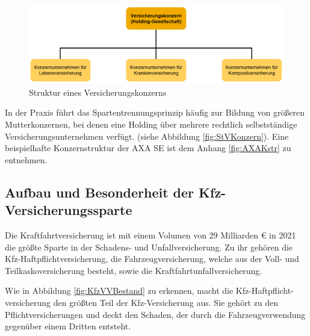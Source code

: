 \begin{figure}[h]
    \centering
    \includegraphics[width=1\textwidth]{img/Struktur_VKonzern2.jpg}
    \caption[Struktur eines Versicherungskonzerns]{Struktur eines Versicherungskonzerns\autocite{StVKonzern}}
    \label{fig:StVKonzern}
\end{figure}


In der Praxis führt das Spartentrennungsprinzip häufig zur Bildung von größeren Mutterkonzernen, bei denen eine Holding über mehrere rechtlich selbstständige Versicherungsunternehmen verfügt. (siehe Abbildung \vref{fig:StVKonzern}). Eine beispielhafte Konzernstruktur der AXA SE ist dem Anhang \ref{fig:AXAKstr} zu entnehmen. 


\subsection{Aufbau und Besonderheit der Kfz-Versicherungssparte}

Die Kraftfahrtversicherung ist mit einem Volumen von 29 Milliarden € in 2021 die größte Sparte in der Schadens- und Unfallversicherung.\autocite[Vgl.][]{GDVSUV} Zu ihr gehören die Kfz-Haftpflichtversicherung, die Fahrzeugversicherung, welche aus der Voll- und Teilkaskoversicherung besteht, sowie die Kraftfahrtunfallversicherung.\autocite[Vgl.][S. 8]{MURINGER2000}

Wie in Abbildung \vref{fig:KfzVVBestand} zu erkennen, macht die Kfz-Haftpflicht- versicherung den größten Teil der Kfz-Versicherung aus. Sie gehört zu den Pflichtversicherungen und deckt den Schaden, der durch die Fahrzeugverwendung gegenüber einem Dritten entsteht. \autocite[Vgl.][S. 81]{STADLER2008}

